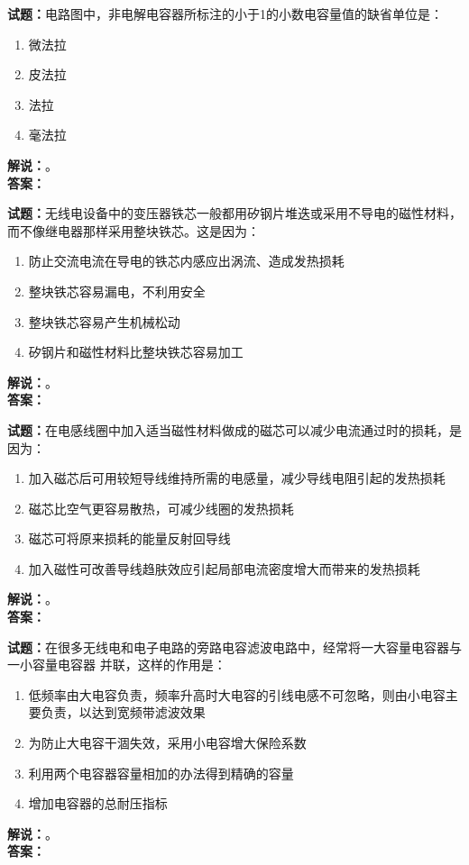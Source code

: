 \documentclass{ctexbook}
\begin{document}
\bigskip




\noindent\textbf{试题：}电路图中，非电解电容器所标注的小于1的小数电容量值的缺省单位是：
\begin{enumerate}[leftmargin=3em]
\item 微法拉
\item 皮法拉
\item 法拉
\item 毫法拉
\end{enumerate}
\noindent\textbf{解说：}\textbf{}。\\\noindent\textbf{答案：}

\bigskip




\noindent\textbf{试题：}无线电设备中的变压器铁芯一般都用矽钢片堆迭或采用不导电的磁性材料，而不像继电器那样采用整块铁芯。这是因为：
\begin{enumerate}[leftmargin=3em]
\item 防止交流电流在导电的铁芯内感应出涡流、造成发热损耗
\item 整块铁芯容易漏电，不利用安全
\item 整块铁芯容易产生机械松动
\item 矽钢片和磁性材料比整块铁芯容易加工
\end{enumerate}
\noindent\textbf{解说：}\textbf{}。\\\noindent\textbf{答案：}

\bigskip




\noindent\textbf{试题：}在电感线圈中加入适当磁性材料做成的磁芯可以减少电流通过时的损耗，是因为：
\begin{enumerate}[leftmargin=3em]
\item 加入磁芯后可用较短导线维持所需的电感量，减少导线电阻引起的发热损耗
\item 磁芯比空气更容易散热，可减少线圈的发热损耗
\item 磁芯可将原来损耗的能量反射回导线
\item 加入磁性可改善导线趋肤效应引起局部电流密度增大而带来的发热损耗
\end{enumerate}
\noindent\textbf{解说：}\textbf{}。\\\noindent\textbf{答案：}

\bigskip




\noindent\textbf{试题：}在很多无线电和电子电路的旁路电容滤波电路中，经常将一大容量电容器与一小容量电容器 并联，这样的作用是：
\begin{enumerate}[leftmargin=3em]
\item 低频率由大电容负责，频率升高时大电容的引线电感不可忽略，则由小电容主要负责，以达到宽频带滤波效果
\item 为防止大电容干涸失效，采用小电容增大保险系数
\item 利用两个电容器容量相加的办法得到精确的容量
\item 增加电容器的总耐压指标
\end{enumerate}
\noindent\textbf{解说：}\textbf{}。\\\noindent\textbf{答案：}
\end{document}
